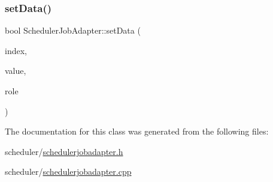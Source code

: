 \mbox{\label{class_scheduler_job_adapter_a25cab29447458f66d2474edf2d0060a6}} 
\subsubsection{\texorpdfstring{setData()}{setData()}}
{\footnotesize\ttfamily bool Scheduler\+Job\+Adapter\+::set\+Data (\begin{DoxyParamCaption}\item[{const Q\+Model\+Index \&}]{index,  }\item[{const Q\+Variant \&}]{value,  }\item[{int}]{role }\end{DoxyParamCaption})\hspace{0.3cm}{\ttfamily [override]}}



The documentation for this class was generated from the following files\+:\begin{DoxyCompactItemize}
\item 
scheduler/\mbox{\hyperlink{schedulerjobadapter_8h}{schedulerjobadapter.\+h}}\item 
scheduler/\mbox{\hyperlink{schedulerjobadapter_8cpp}{schedulerjobadapter.\+cpp}}\end{DoxyCompactItemize}
